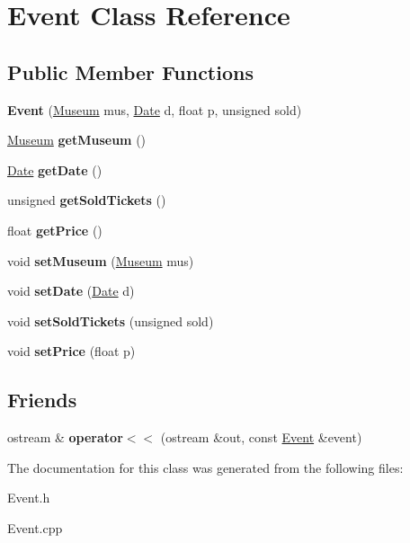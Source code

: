 \hypertarget{classEvent}{}\section{Event Class Reference}
\label{classEvent}
\subsection*{Public Member Functions}
\begin{DoxyCompactItemize}
\item 
\mbox{\label{classEvent_ace5eb5579a8bae09fd33bf3dc5b6c23a}} 
{\bfseries Event} (\hyperlink{classMuseum}{Museum} mus, \hyperlink{classDate}{Date} d, float p, unsigned sold)
\item 
\mbox{\label{classEvent_aed969b2cf0417efe4629400d17cd86c8}} 
\hyperlink{classMuseum}{Museum} {\bfseries get\+Museum} ()
\item 
\mbox{\label{classEvent_ae6dc63317f9d6668c0abf8a428a4d8f0}} 
\hyperlink{classDate}{Date} {\bfseries get\+Date} ()
\item 
\mbox{\label{classEvent_a57f589f4518b23610f1be7c565d39399}} 
unsigned {\bfseries get\+Sold\+Tickets} ()
\item 
\mbox{\label{classEvent_aad1626ca420aaa13473e09edd765608e}} 
float {\bfseries get\+Price} ()
\item 
\mbox{\label{classEvent_a1ec902b6f63558247b3b5e097fe41dfd}} 
void {\bfseries set\+Museum} (\hyperlink{classMuseum}{Museum} mus)
\item 
\mbox{\label{classEvent_a60a25f08b7850e19959957dfbfb0f1fc}} 
void {\bfseries set\+Date} (\hyperlink{classDate}{Date} d)
\item 
\mbox{\label{classEvent_a4829045c66119c58814646e86e9846c2}} 
void {\bfseries set\+Sold\+Tickets} (unsigned sold)
\item 
\mbox{\label{classEvent_aa4580054c6b0ebb73bcc4a8126a28059}} 
void {\bfseries set\+Price} (float p)
\end{DoxyCompactItemize}
\subsection*{Friends}
\begin{DoxyCompactItemize}
\item 
\mbox{\label{classEvent_a989f2972dca76b2532ca37392f2830be}} 
ostream \& {\bfseries operator$<$$<$} (ostream \&out, const \hyperlink{classEvent}{Event} \&event)
\end{DoxyCompactItemize}


The documentation for this class was generated from the following files\+:\begin{DoxyCompactItemize}
\item 
Event.\+h\item 
Event.\+cpp\end{DoxyCompactItemize}
